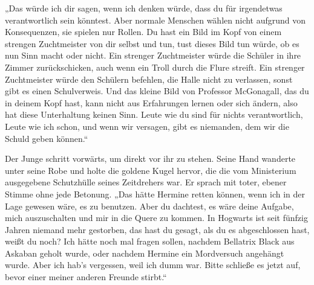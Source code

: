 „Das würde ich dir sagen, wenn ich denken würde, dass du für irgendetwas verantwortlich sein könntest. Aber normale Menschen wählen nicht aufgrund von Konsequenzen, sie spielen nur Rollen. Du hast ein Bild im Kopf von einem strengen Zuchtmeister von dir selbst und tun, tust dieses Bild tun würde, ob es nun Sinn macht oder nicht. Ein strenger Zuchtmeister würde die Schüler in ihre Zimmer zurückschicken, auch wenn ein Troll durch die Flure streift. Ein strenger Zuchtmeister würde den Schülern befehlen, die Halle nicht zu verlassen, sonst gibt es einen Schulverweis. Und das kleine Bild von Professor McGonagall, das du in deinem Kopf hast, kann nicht aus Erfahrungen lernen oder sich ändern, also hat diese Unterhaltung keinen Sinn. Leute wie du sind für nichts verantwortlich, Leute wie ich schon, und wenn wir versagen, gibt es niemanden, dem wir die Schuld geben können.“

Der Junge schritt vorwärts, um direkt vor ihr zu stehen. Seine Hand wanderte unter seine Robe und holte die goldene Kugel hervor, die die vom Ministerium ausgegebene Schutzhülle seines Zeitdrehers war. Er sprach mit toter, ebener Stimme ohne jede Betonung. „Das hätte Hermine retten können, wenn ich in der Lage gewesen wäre, es zu benutzen. Aber du dachtest, es wäre deine Aufgabe, mich auszuschalten und mir in die Quere zu kommen. In Hogwarts ist seit fünfzig Jahren niemand mehr gestorben, das hast du gesagt, als du es abgeschlossen hast, weißt du noch? Ich hätte noch mal fragen sollen, nachdem Bellatrix Black aus Askaban geholt wurde, oder nachdem Hermine ein Mordversuch angehängt wurde. Aber ich hab's vergessen, weil ich dumm war. Bitte schließe es jetzt auf, bevor einer meiner anderen Freunde stirbt.“

